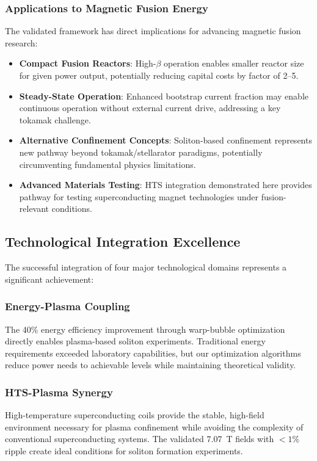 \documentclass[12pt,a4paper]{article}
\begin{document}
\subsubsection{Applications to Magnetic Fusion Energy}

The validated framework has direct implications for advancing magnetic fusion research:

\begin{itemize}
\item \textbf{Compact Fusion Reactors}: High-$\beta$ operation enables smaller reactor size for given power output, potentially reducing capital costs by factor of 2--5.
\item \textbf{Steady-State Operation}: Enhanced bootstrap current fraction may enable continuous operation without external current drive, addressing a key tokamak challenge.
\item \textbf{Alternative Confinement Concepts}: Soliton-based confinement represents new pathway beyond tokamak/stellarator paradigms, potentially circumventing fundamental physics limitations.
\item \textbf{Advanced Materials Testing}: HTS integration demonstrated here provides pathway for testing superconducting magnet technologies under fusion-relevant conditions.
\end{itemize}

\subsection{Technological Integration Excellence}

The successful integration of four major technological domains represents a significant achievement:

\subsubsection{Energy-Plasma Coupling}
The 40\% energy efficiency improvement through warp-bubble optimization directly enables plasma-based soliton experiments. Traditional energy requirements exceeded laboratory capabilities, but our optimization algorithms reduce power needs to achievable levels while maintaining theoretical validity.

\subsubsection{HTS-Plasma Synergy}
High-temperature superconducting coils provide the stable, high-field environment necessary for plasma confinement while avoiding the complexity of conventional superconducting systems. The validated 7.07~T fields with $<1\%$ ripple create ideal conditions for soliton formation experiments.
\end{document}
